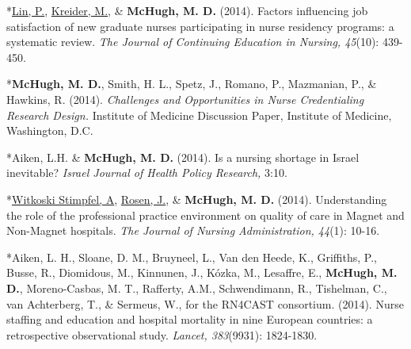 \documentclass[10pt,]{article}
\begin{document}
{{{{{{{{{{{{{{{\begin{hangparas}{.25in}{1}
\end{hangparas}



\begin{hangparas}{.25in}{1}

*{\underline {Lin, P.}}, {\underline {Kreider, M.}}, \& {\textbf {McHugh, M. D.}} (2014). Factors influencing job satisfaction of new graduate nurses participating in nurse residency programs: a systematic review. {\textit {The Journal of Continuing Education in Nursing, 45}}(10): 439-450.

\end{hangparas}



\begin{hangparas}{.25in}{1}

*{\textbf {McHugh, M. D.}}, Smith, H. L., Spetz, J., Romano, P., Mazmanian, P., \& Hawkins, R. (2014). {\textit {Challenges and Opportunities in Nurse Credentialing Research Design.}} Institute of Medicine Discussion Paper, Institute of Medicine, Washington, D.C.

\end{hangparas}



\begin{hangparas}{.25in}{1}

*Aiken, L.H. \& {\textbf {McHugh, M. D.}} (2014). Is a nursing shortage in Israel inevitable? {\textit {Israel Journal of Health Policy Research,}} 3:10.

\end{hangparas}



\begin{hangparas}{.25in}{1}

*{\underline {Witkoski Stimpfel, A}}, {\underline {Rosen, J.}}, \& {\textbf {McHugh, M. D.}} (2014). Understanding the role of the professional practice environment on quality of care in Magnet and Non-Magnet hospitals. {\textit {The Journal of Nursing Administration, 44}}(1): 10-16.

\end{hangparas}



\begin{hangparas}{.25in}{1}

*Aiken, L. H., Sloane, D. M., Bruyneel, L., Van den Heede, K., Griffiths, P., Busse, R., Diomidous, M., Kinnunen, J., Kózka, M., Lesaffre, E., {\textbf {McHugh, M. D.}}, Moreno-Casbas, M. T., Rafferty, A.M., Schwendimann, R., Tishelman, C., van Achterberg, T., \& Sermeus, W., for the RN4CAST consortium. (2014). Nurse staffing and education and hospital mortality in nine European countries: a retrospective observational study. {\textit {Lancet, 383}}(9931): 1824-1830.


\end{hangparas}}}}}}}}}}}}}}}}
\end{document}
